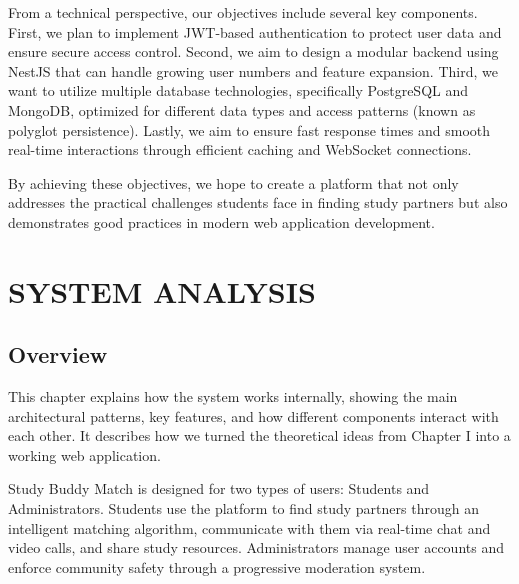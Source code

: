 \documentclass[a4paper,12pt]{report}
\begin{document}
From a technical perspective, our objectives include several key components. First, we plan to implement JWT-based authentication to protect user data and ensure secure access control. Second, we aim to design a modular backend using NestJS that can handle growing user numbers and feature expansion. Third, we want to utilize multiple database technologies, specifically PostgreSQL and MongoDB, optimized for different data types and access patterns (known as polyglot persistence). Lastly, we aim to ensure fast response times and smooth real-time interactions through efficient caching and WebSocket connections.

By achieving these objectives, we hope to create a platform that not only addresses the practical challenges students face in finding study partners but also demonstrates good practices in modern web application development.

\setlength{\parindent}{15pt}
\setlength{\parskip}{0em}
\linespread{1}\selectfont

\chapter{SYSTEM ANALYSIS}

\setlength{\parindent}{0pt}
\setlength{\parskip}{0.6em}
\linespread{1.3}\selectfont
\titlespacing*{\section}{0pt}{12pt}{4pt}

\section{Overview}

This chapter explains how the system works internally, showing the main architectural patterns, key features, and how different components interact with each other. It describes how we turned the theoretical ideas from Chapter I into a working web application.

Study Buddy Match is designed for two types of users: Students and Administrators. Students use the platform to find study partners through an intelligent matching algorithm, communicate with them via real-time chat and video calls, and share study resources. Administrators manage user accounts and enforce community safety through a progressive moderation system.
\end{document}
